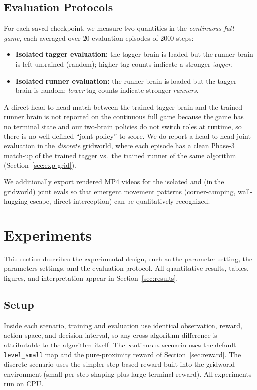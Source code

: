 \documentclass[conference]{IEEEtran}
\begin{document}
\subsection{Evaluation Protocols}\label{sec:eval-protocol}

For each saved checkpoint, we measure two quantities in the
\emph{continuous full game}, each averaged over 20 evaluation episodes of
2000 steps:

\begin{itemize}
    \item \textbf{Isolated tagger evaluation:} the tagger brain is loaded
    but the runner brain is left untrained (random); higher tag counts
    indicate a stronger \emph{tagger}.
    \item \textbf{Isolated runner evaluation:} the runner brain is loaded
    but the tagger brain is random; \emph{lower} tag counts indicate
    stronger \emph{runners}.
\end{itemize}

A direct head-to-head match between the trained tagger brain and the
trained runner brain is not reported on the continuous full game because
the game has no terminal state and our two-brain policies do not switch
roles at runtime, so there is no well-defined ``joint policy'' to score.
We do report a head-to-head joint evaluation in the \emph{discrete}
gridworld, where each episode has a clean Phase-3 match-up of the
trained tagger vs.\ the trained runner of the same algorithm
(Section~\ref{sec:exp-grid}).

We additionally export rendered MP4 videos for the isolated and (in the
gridworld) joint evals so that emergent movement patterns
(corner-camping, wall-hugging escape, direct interception) can be
qualitatively recognized.

\section{Experiments}\label{sec:experiments}

This section describes the experimental design, such as the parameter setting, the parameters settings, and the evaluation protocol. All quantitative results, tables, figures, and interpretation appear in Section~\ref{sec:results}.

\subsection{Setup}

Inside each scenario, training and evaluation use identical observation,
reward, action space, and decision interval, so any cross-algorithm
difference is attributable to the algorithm itself. The continuous
scenario uses the default \texttt{level\_small} map and the
pure-proximity reward of Section~\ref{sec:reward}. The discrete scenario
uses the simpler step-based reward built into the gridworld environment
(small per-step shaping plus large terminal reward). All experiments run
on CPU.
\end{document}

